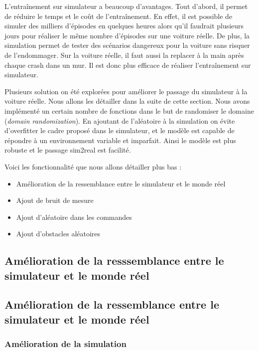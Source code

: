 \documentclass[french]{article}
\begin{document}
\vspace{0.5cm}
L'entraînement sur simulateur a beaucoup d'avantages. Tout d'abord, il permet de réduire le temps et le coût
de l'entraînement. En effet, il est possible de simuler des milliers d'épisodes en quelques heures 
alors qu'il faudrait plusieurs jours pour réaliser le même nombre d'épisodes sur une voiture réelle. De plus,
la simulation permet de tester des scénarios dangereux pour la voiture sans risquer de l'endommager.
Sur la voiture réelle, il faut aussi la replacer à la main après chaque crash dans un mur. Il est donc plus
efficace de réaliser l'entraînement sur simulateur.

\vspace{0.5cm}

Plusieurs solution on été explorées pour améliorer le passage du simulateur à la voiture réelle. Nous allons les détailler dans la suite de cette section. Nous avons implémenté  un certain nombre de fonctions dans le but de randomiser le domaine (\textit{domain randomization}). En ajoutant de l'aléatoire à la simulation on évite d'overfitter le cadre proposé dans le simulateur, et le modèle est capable de répondre à un environnement variable et imparfait. Ainsi le modèle est plus robuste et le passage sim2real est facilité\cite{tobin2017domain}.

\vspace{0.5cm}

Voici les fonctionnalité que nous allons détailler plus bas :
\begin{itemize}
    \item Amélioration de la ressemblance entre le simulateur et le monde réel
    \item Ajout de bruit de mesure
    \item Ajout d'aléatoire dans les commandes
    \item Ajout d'obstacles aléatoires
\end{itemize}

\subsection{Amélioration de la resssemblance entre le simulateur et le monde réel}
\subsection{Amélioration de la ressemblance entre le simulateur et le monde réel}

\subsubsection{Amélioration de la simulation}
\end{document}
